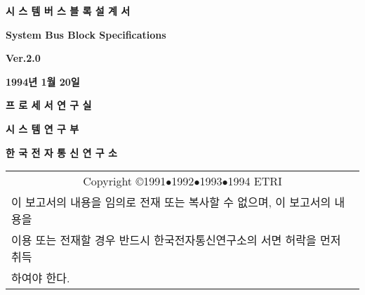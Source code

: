 %
\pagestyle{fancy}
\setlength{\headrulewidth}{0pt}
\lhead{\leftmark}
\chead{}
\rhead{\rightmark}
\lfoot{}
\rfoot{}
%
%

\begin{center}{\LARGE\bf 시 스 템 버 스 블 록 설 계 서}\end{center}
\vspace{10mm}
\begin{center}{\Large\bf System Bus Block Specifications}\end{center}
\vspace{15mm}
\begin{center}{\Large\bf Ver.2.0}\end{center}
\vspace{15mm}
\begin{center}{\Large\bf 1994년 1월 20일}\end{center}
\vspace{40mm}
\begin{center}{\Large\bf 프 로 세 서 연 구 실}\end{center}
\begin{center}{\Large\bf 시 스 템 연 구 부}\end{center}
\begin{center}{\Large\bf 한 국 전 자 통 신 연 구 소}\end{center}
\begin{table}[b]
   \begin{center}
     \begin{tabular}{|l|} \hline
	\multicolumn{1}{|c|}{Copyright \copyright 1991$\bullet$1992$\bullet$1993$\bullet$1994 ETRI} \\
	이 보고서의 내용을 임의로 전재 또는 복사할 수 없으며, 이 보고서의 내용을 \\
	이용 또는 전재할 경우 반드시 한국전자통신연구소의 서면 허락을 먼저 취득 \\
	하여야 한다. \\ \hline
     \end{tabular}
   \end{center}
\end{table}

%
